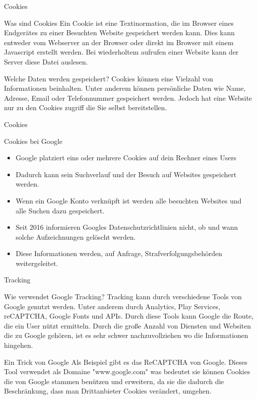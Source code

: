 \documentclass[11pt]{beamer}
\begin{document}
\begin{frame}{Cookies}
    \begin{block}{Was sind Cookies}
            Ein Cookie ist eine Textinormation, die im Browser eines Endgerätes zu einer Besuchten Website gespeichert werden kann. Dies kann entweder vom Webserver an der Browser oder direkt im Browser mit einem Javascript erstellt werden. Bei wiederholtem aufrufen einer Website kann der Server diese Datei auslesen.
    \end{block} 
    \begin{block}{Welche Daten werden gespeichert?}
            Cookies können eine Vielzahl von Informationen beinhalten. Unter anderem können persönliche Daten wie Name, Adresse, Email oder Telefonnummer gespeichert werden. Jedoch hat eine Website nur zu den Cookies zugriff die Sie selbst bereitstellen.
    \end{block}
\end{frame}

\begin{frame}{Cookies}
    \begin{block}{Cookies bei Google}
        \begin{itemize} 
        \item Google platziert eins oder mehrere Cookies auf dein Rechner eines Users
        \item Dadurch kann sein Suchverlauf und der Besuch auf Websites gespeichert werden.
        \item Wenn ein Google Konto verknüpft ist werden alle besuchten Websites und alle Suchen dazu gespeichert.
        \item Seit 2016 informieren Googles Datenschutzrichtlinien nicht, ob und wann solche Aufzeichnungen gelöscht werden.
        \item Diese Informationen werden, auf Anfrage, Strafverfolgungsbehörden weitergeleitet.
        \end{itemize}
    \end{block}



\end{frame}

\begin{frame}{Tracking}
    \begin{block}{Wie verwendet Google Tracking?}
        Tracking kann durch verschiedene Tools von Google genutzt werden. Unter anderem durch Analytics, Play Services, reCAPTCHA, Google Fonts und APIs. Durch diese Tools kann Google die Route, die ein User nützt ermitteln. Durch die große Anzahl von Diensten und Websiten die zu Google gehören, ist es sehr schwer nachzuvollziehen wo die Informationen hingehen.
    \end{block}
    \begin{block}{Ein Trick von Google}
        Als Beispiel gibt es das ReCAPTCHA von Google. Dieses Tool verwendet als Domaine "www.google.com" was bedeutet sie können Cookies die von Google stammen benützen und erweitern, da sie die dadurch die Beschränkung, dass man Drittanbieter Cookies verändert, umgehen.
    \end{block}
\end{frame}
\end{document}
